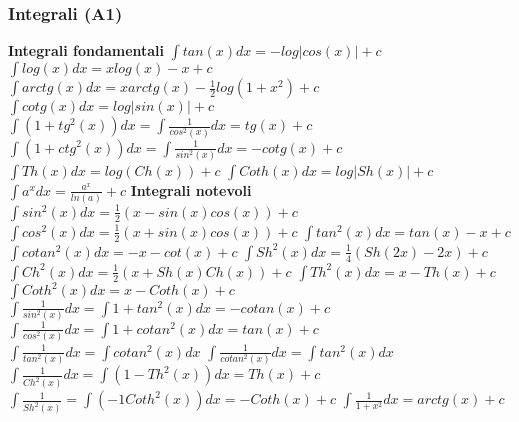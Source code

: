 \documentclass[fontsize=8pt]{scrartcl}
\begin{document}
\begin{multicols*}{4}
\subsubsection*{Integrali (A1)}
\textbf{Integrali fondamentali}\newline
$
\int tan(x) dx = -log|cos(x)| +c
$\newline
$
\int log(x) dx = x log(x) -x + c
$\newline
$
\int arctg (x) dx = x arctg(x) -\frac{1}{2}log(1+x^2) + c 
$\newline
$
\int cotg(x) dx = log|sin(x)| +c
$\newline
$
\int (1+tg^2(x))dx = \int \frac{1}{cos^2(x)} dx = tg(x) +c
$\newline
$
\int (1+ctg^2(x))dx = \int \frac{1}{sin^2(x)} dx = -cotg(x) +c
$\newline
$
\int Th(x) dx = log(Ch(x))+c
$\newline
$
\int Coth(x) dx = log|Sh(x)| +c
$\newline
$
\int a^x dx = \frac{a^x}{ln(a)}+c
$\newline
\textbf{Integrali notevoli}
$
\int sin^2(x) dx = \frac{1}{2}(x-sin(x)cos(x)) +c
$\newline
$
\int cos^2(x) dx = \frac{1}{2}(x+sin(x)cos(x)) +c
$\newline
$
\int tan^2(x) dx = tan(x) -x +c
$\newline
$
\int cotan^2(x) dx = -x -cot(x) +c 
$\newline
$
\int Sh^2(x) dx = \frac{1}{4}(Sh(2x)-2x) +c
$\newline
$
\int Ch^2(x) dx = \frac{1}{2}(x + Sh(x)Ch(x)) +c
$\newline
$
\int Th^2(x) dx = x - Th(x) +c 
$\newline
$
\int Coth^2(x) dx = x - Coth(x) +c 
$\newline
$
\int \frac{1}{sin^2(x)} dx = \int 1 + tan^2(x) dx = -cotan(x) + c
$\newline
$
\int \frac{1}{cos^2(x)} dx = \int 1 + cotan^2(x) dx = tan(x) + c
$\newline
$
\int \frac{1}{tan^2 (x)} dx = \int cotan^2(x) dx 
$\newline
$
\int \frac{1}{cotan^2(x) }dx = \int tan^2(x) dx 
$\newline
$
\int \frac{1}{Ch^2(x)} dx = \int (1-Th^2(x))dx= Th(x)+c
$\newline
$
\int \frac{1}{Sh^2(x)} = \int (-1 Coth^2(x)) dx = -Coth(x) +c
$\newline
$
\int \frac{1}{1+x^2} dx = arctg(x) +c
$\newline

\end{multicols*}
\end{document}
